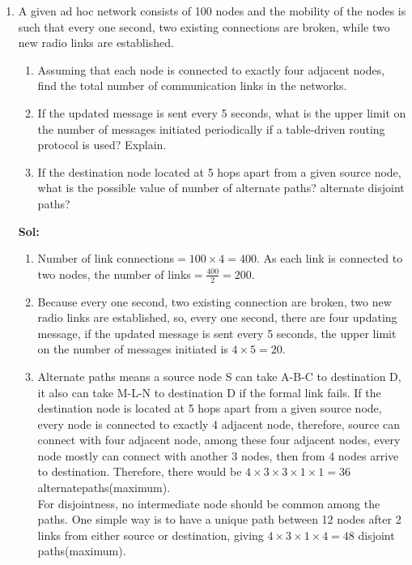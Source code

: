 \documentclass[11pt]{article}
\begin{document}
\begin{enumerate}
\item A given ad hoc network consists of 100 nodes and the mobility of the nodes is such that every one second, two existing connections are broken, while two new radio links are established.
	\begin{enumerate}
	\item Assuming that each node is connected to exactly four adjacent nodes, find the total number of communication links in the networks.
	\item If the updated message is sent every 5 seconds, what is the upper limit on the number of messages initiated periodically if a table-driven routing protocol is used? Explain.
	\item If the destination node located at 5 hops apart from a given source node, what is the possible value of number of alternate paths? alternate disjoint paths?
	\end{enumerate}
\textbf{Sol:} 
	\begin{enumerate}
	\item Number of link connections$=100\times 4=400$. As each link is connected to two nodes, the number of links$=\frac{400}{2}=200$.
	\item Because every one second, two existing connection are broken, two new radio links are established, so, every one second, there are four updating message, if the updated message is sent every 5 seconds, the upper limit on the number of messages initiated is $4\times 5=20$.
	\item Alternate paths means a source node S can take A-B-C to destination D, it also can take M-L-N to destination D if the formal link fails. If the destination node is located at 5 hops apart from a given source node, every node is connected to exactly 4 adjacent node, therefore, source can connect with four adjacent node, among these four adjacent nodes, every node mostly can connect with another 3 nodes, then from 4 nodes arrive to destination. Therefore, there would be $4\times 3\times 3\times 1\times 1= 36$ alternatepaths(maximum).\\
	For disjointness, no intermediate node should be common among the paths. One simple way is to have a unique path between 12 nodes after 2 links from either source or destination, giving $4\times 3\times 1\times 4=48$ disjoint paths(maximum).
	\end{enumerate}


\end{enumerate}
\end{document}

